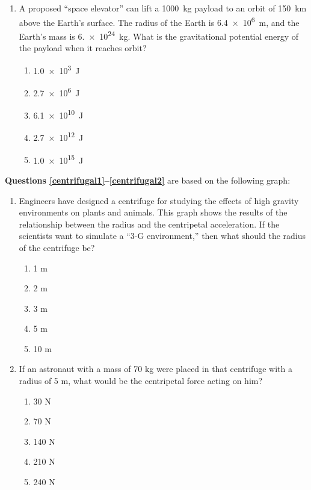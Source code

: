 \documentclass{../../../oss-classkick}
\begin{document}
\begin{multicols}{2}
\begin{enumerate}[leftmargin=18pt]
  \item A proposed ``space elevator'' can lift a \SI{1000}{\kilo\gram} payload
    to an orbit of \SI{150}{\kilo\metre} above the Earth's surface. The radius
    of the Earth is \SI{6.4e6}{\metre}, and the Earth's mass is
    \SI{6.e24}{\kilo\gram}. What is the gravitational potential energy of the
    payload when it reaches orbit?
    \begin{enumerate}[nosep,leftmargin=18pt,label=(\Alph*)]
    \item\SI{1.0e3}{\joule}
    \item\SI{2.7e6}{\joule}
    \item\SI{6.1e10}{\joule}
    \item\SI{2.7e12}{\joule}
    \item\SI{1.0e15}{\joule}
    \end{enumerate}
  \end{enumerate}
  \columnbreak
  
  \textbf{Questions \ref{centrifugal1}--\ref{centrifugal2}} are based on the
  following graph:

  \begin{enumerate}[leftmargin=18pt,resume]
  \item Engineers have designed a centrifuge for studying the effects of high
    gravity environments on plants and animals. This graph shows the
    results of the relationship between the radius and the centripetal
    acceleration. If the scientists want to simulate a “3-G environment,”
    then what should the radius of the centrifuge be?
    \label{centrifugal1}
    \begin{enumerate}[nosep,leftmargin=18pt,label=(\Alph*)]
    \item 1 m
    \item 2 m
    \item 3 m
    \item 5 m
    \item 10 m
    \end{enumerate}
    
  \item If an astronaut with a mass of 70 kg were placed in that centrifuge with
    a radius of 5 m, what would be the centripetal force acting on him?
    \label{centrifugal2}
    \begin{enumerate}[nosep,leftmargin=18pt,label=(\Alph*)]
    \item 30 N
    \item 70 N
    \item 140 N
    \item 210 N
    \item 240 N
    \end{enumerate}
    

\end{enumerate}
\end{multicols}
\end{document}

